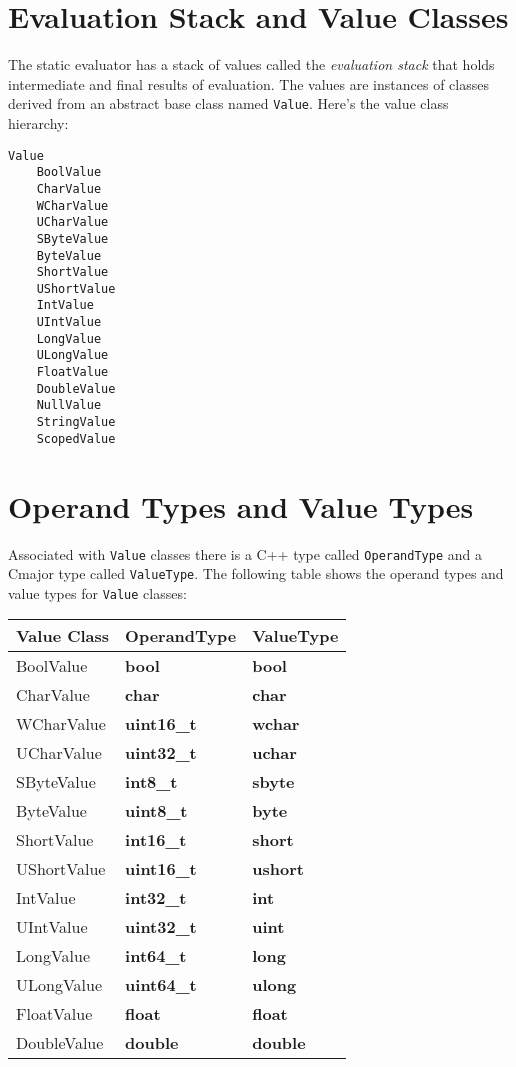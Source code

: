 \documentclass[a4paper,oneside,11pt]{book}
\theoremstyle{definition}
\begin{document}
\section{Evaluation Stack and Value Classes}

The static evaluator has a stack of values called the \emph{evaluation stack} that holds intermediate and final results of evaluation.
The values are instances of classes derived from an abstract base class named \verb|Value|.
Here's the value class hierarchy:

\begin{verbatim}
Value
    BoolValue
    CharValue
    WCharValue
    UCharValue
    SByteValue
    ByteValue
    ShortValue
    UShortValue
    IntValue
    UIntValue
    LongValue
    ULongValue
    FloatValue
    DoubleValue
    NullValue
    StringValue
    ScopedValue
\end{verbatim}

\section{Operand Types and Value Types}

Associated with \verb|Value| classes there is a C++ type called \verb|OperandType| and a Cmajor type called \verb|ValueType|.
The following table shows the operand types and value types for \verb|Value| classes:

\begin{flushleft}
\begin{supertabular}{lll}
\textbf{Value Class}& \textbf{OperandType}& \textbf{ValueType}\\
\hline
BoolValue& \textbf{bool}& \textbf{bool}\\
CharValue& \textbf{char}& \textbf{char}\\
WCharValue& \textbf{uint16_t}& \textbf{wchar}\\
UCharValue& \textbf{uint32_t}& \textbf{uchar}\\
SByteValue& \textbf{int8_t}& \textbf{sbyte}\\
ByteValue& \textbf{uint8_t}& \textbf{byte}\\
ShortValue& \textbf{int16_t}& \textbf{short}\\
UShortValue& \textbf{uint16_t}& \textbf{ushort}\\
IntValue& \textbf{int32_t}& \textbf{int}\\
UIntValue& \textbf{uint32_t}& \textbf{uint}\\
LongValue& \textbf{int64_t}& \textbf{long}\\
ULongValue& \textbf{uint64_t}& \textbf{ulong}\\
FloatValue& \textbf{float}& \textbf{float}\\
DoubleValue& \textbf{double}& \textbf{double}\\
\hline
\end{supertabular}
\end{flushleft}
\end{document}
